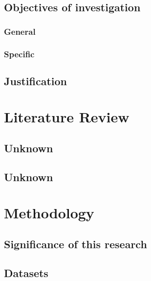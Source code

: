 \documentclass[12pt,a4paper,oneside]{report}
\begin{document}
\section{Objectives of investigation}

\subsection{General}

\subsection{Specific}

\section{Justification}



\chapter{Literature Review}

\section{Unknown}

\section{Unknown}

\chapter{Methodology}

\section{Significance of this research}

\section{Datasets}
\end{document}
